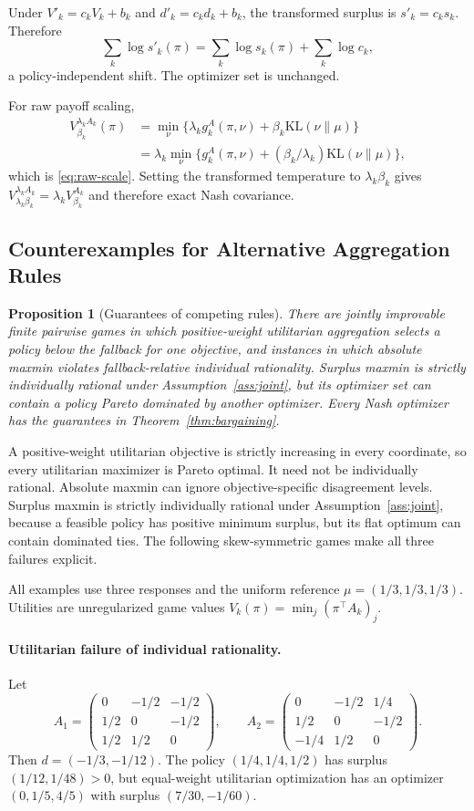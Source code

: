 \documentclass{article}
\newtheorem{proposition}{Proposition}
\theoremstyle{remark}
\theoremstyle{plain}
\newcommand{\KL}{\mathrm{KL}}
\begin{document}
Under $V'_k=c_kV_k+b_k$ and $d'_k=c_kd_k+b_k$, the transformed surplus is $s'_k=c_ks_k$. Therefore
\[
\sum_k\log s'_k(\pi)
=
\sum_k\log s_k(\pi)+\sum_k\log c_k,
\]
a policy-independent shift. The optimizer set is unchanged.

For raw payoff scaling,
\begin{align*}
V_{\beta_k}^{\lambda_kA_k}(\pi)
&=
\min_\nu\{\lambda_kg_k^A(\pi,\nu)+\beta_k\KL(\nu\|\mu)\}\\
&=
\lambda_k\min_\nu\{g_k^A(\pi,\nu)+(\beta_k/\lambda_k)\KL(\nu\|\mu)\},
\end{align*}
which is \eqref{eq:raw-scale}. Setting the transformed temperature to $\lambda_k\beta_k$ gives $V_{\lambda_k\beta_k}^{\lambda_kA_k}=\lambda_kV_{\beta_k}^{A_k}$ and therefore exact Nash covariance.

\subsection{Counterexamples for Alternative Aggregation Rules}
\label{app:rule-witnesses}
\begin{proposition}[Guarantees of competing rules]
\label{prop:rules}
There are jointly improvable finite pairwise games in which positive-weight utilitarian aggregation selects a policy below the fallback for one objective, and instances in which absolute maxmin violates fallback-relative individual rationality. Surplus maxmin is strictly individually rational under Assumption~\ref{ass:joint}, but its optimizer set can contain a policy Pareto dominated by another optimizer. Every Nash optimizer has the guarantees in Theorem~\ref{thm:bargaining}.
\end{proposition}
A positive-weight utilitarian objective is strictly increasing in every coordinate, so every utilitarian maximizer is Pareto optimal. It need not be individually rational. Absolute maxmin can ignore objective-specific disagreement levels. Surplus maxmin is strictly individually rational under Assumption~\ref{ass:joint}, because a feasible policy has positive minimum surplus, but its flat optimum can contain dominated ties. The following skew-symmetric games make all three failures explicit.

All examples use three responses and the uniform reference $\mu=(1/3,1/3,1/3)$. Utilities are unregularized game values $V_k(\pi)=\min_j(\pi^\top A_k)_j$.

\paragraph{Utilitarian failure of individual rationality.}
Let
\[
A_1=
\begin{pmatrix}
0&-1/2&-1/2\\
1/2&0&-1/2\\
1/2&1/2&0
\end{pmatrix},
\qquad
A_2=
\begin{pmatrix}
0&-1/2&1/4\\
1/2&0&-1/2\\
-1/4&1/2&0
\end{pmatrix}.
\]
Then $d=(-1/3,-1/12)$. The policy $(1/4,1/4,1/2)$ has surplus $(1/12,1/48)>0$, but equal-weight utilitarian optimization has an optimizer $(0,1/5,4/5)$ with surplus $(7/30,-1/60)$.
\end{document}
